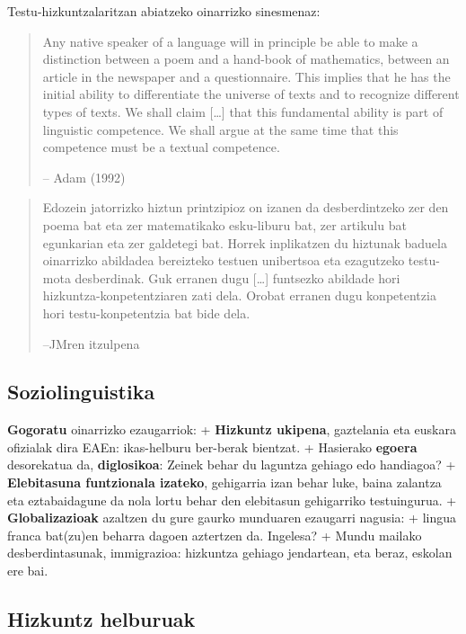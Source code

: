 \documentclass[
]{book}
\begin{document}
Testu-hizkuntzalaritzan abiatzeko oinarrizko sinesmenaz:

\begin{quote}
Any native speaker of a language will in principle be able to make a distinction between a poem and a hand-book of mathematics, between an article in the newspaper and a questionnaire. This implies that he has the initial ability to differentiate the universe of texts and to recognize different types of texts. We shall claim {[}\ldots{]} that this fundamental ability is part of linguistic competence. We shall argue at the same time that this competence must be a textual competence.

-- Adam (1992)
\end{quote}

\begin{quote}
Edozein jatorrizko hiztun printzipioz on izanen da desberdintzeko zer den poema bat eta zer matematikako esku-liburu bat, zer artikulu bat egunkarian eta zer galdetegi bat. Horrek inplikatzen du hiztunak baduela oinarrizko abildadea bereizteko testuen unibertsoa eta ezagutzeko testu-mota desberdinak. Guk erranen dugu {[}\ldots{]} funtsezko abildade hori hizkuntza-konpetentziaren zati dela. Orobat erranen dugu konpetentzia hori testu-konpetentzia bat bide dela.

--JMren itzulpena
\end{quote}

\hypertarget{soziolinguistika-1}{%
\subsection{Soziolinguistika}\label{soziolinguistika-1}}

\textbf{Gogoratu} oinarrizko ezaugarriok:
+ \textbf{Hizkuntz ukipena}, gaztelania eta euskara ofizialak dira EAEn: ikas-helburu ber-berak bientzat.
+ Hasierako \textbf{egoera} desorekatua da, \textbf{diglosikoa}:
Zeinek behar du laguntza gehiago edo handiagoa?
+ \textbf{Elebitasuna funtzionala izateko}, gehigarria izan behar luke, baina zalantza eta eztabaidagune da nola lortu behar den elebitasun gehigarriko testuingurua.
+ \textbf{Globalizazioak} azaltzen du gure gaurko munduaren ezaugarri nagusia:
+ lingua franca bat(zu)en beharra dagoen aztertzen da. Ingelesa?
+ Mundu mailako desberdintasunak, immigrazioa: hizkuntza gehiago jendartean, eta beraz, eskolan ere bai.

\hypertarget{hizkuntz-helburuak}{%
\subsection{Hizkuntz helburuak}\label{hizkuntz-helburuak}}
\end{document}
